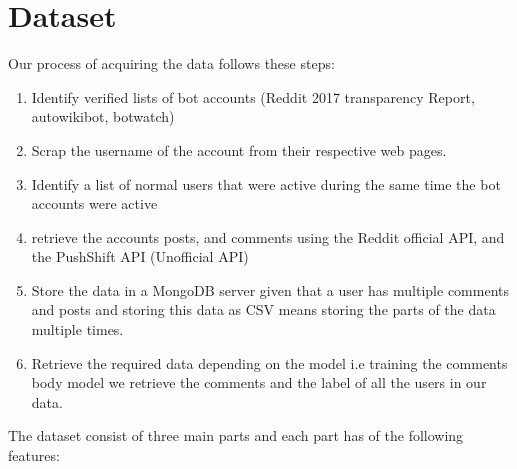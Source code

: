 \documentclass{article}
\begin{document}
\section{Dataset}
Our process of acquiring the data follows these steps:
    \begin{enumerate}
        \item Identify verified lists of bot accounts (Reddit 2017 transparency Report, autowikibot, botwatch)
        \item Scrap the username of the account from their respective web pages.
        \item Identify a list of normal users that were active during the same time the bot accounts were active
        \item retrieve the accounts posts, and comments using the Reddit official API, and the PushShift API (Unofficial API)
        \item Store the data in a MongoDB server given that a user has multiple comments and posts and storing this data as CSV means storing the parts of the data multiple times.
        \item Retrieve the required data depending on the model i.e training the comments body model we retrieve the comments and the label of all the users in our data.
    \end{enumerate}
The dataset consist of three main parts and each part has of the following features:
\end{document}
